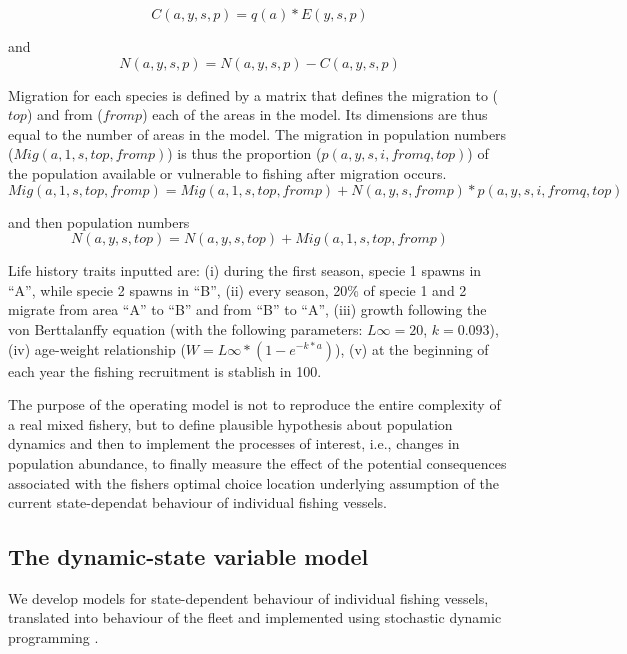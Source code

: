 \documentclass[12pt,oneline,a4paper,numbib]{ouparticle}
\begin{document}
\begin{equation*}
C (a, y, s, p) = q(a) * E(y,s,p)
\end{equation*}

and 
\begin{equation*}
N (a, y, s, p) = N (a, y, s, p) - C (a, y, s, p) 
\end{equation*}

Migration for each species is defined by a matrix that defines the migration to ($top$) and from ($fromp$) each of the areas in the model. Its dimensions are thus equal to the number of areas in the model.  The migration in population numbers ($Mig (a, 1, s, top, fromp)$) is thus the proportion ($p (a, y, s, i, fromq, top)$) of the population available or vulnerable to fishing after migration occurs.   
\begin{equation*}
Mig (a, 1, s, top, fromp) = Mig(a, 1, s, top, fromp) + N (a, y, s, fromp) * p (a, y, s, i, fromq, top)
\end{equation*}

and then population numbers
\begin{equation*}
N (a, y, s, top) = N (a, y, s, top) +  Mig (a, 1, s, top, fromp)
\end{equation*}

Life history traits inputted are: (i)  during the first season, specie 1 spawns in ``A'', while specie 2 spawns in ``B'', (ii) every season, 20\% of specie 1 and 2 migrate from area ``A'' to ``B'' and from ``B'' to ``A'', (iii) growth following the von Berttalanffy equation (with the following parameters: $L\infty= 20$, $k= 0.093$), (iv) age-weight relationship ($W= L\infty*(1-e^{-k*a})$), (v) at the beginning of each year the fishing recruitment is stablish in 100.

The purpose of the operating model is not to reproduce the entire complexity of a real mixed fishery, but to define plausible hypothesis about population dynamics and then to implement the processes of interest, i.e., changes in population abundance, to finally measure the effect of the potential consequences associated with the fishers optimal choice location underlying assumption of the current state-dependat behaviour of individual fishing vessels.

\subsection{The dynamic-state variable model}
\label{sec2.2}

We develop models for state-dependent behaviour of individual fishing vessels, translated into behaviour of the fleet and implemented using stochastic dynamic programming \cite{Alzorriz2017, Batsleer2015, ClarkandMangel2000, Dowling2011, Houston1999, Poos2010}. 
\end{document}
